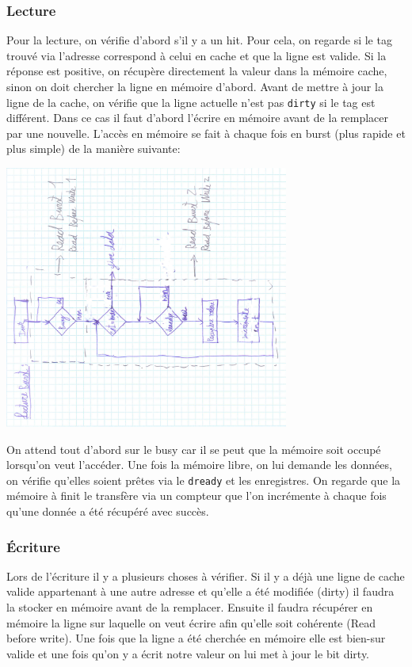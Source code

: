 \documentclass[10pt,a4paper]{article}
\begin{document}
\subsubsection{Lecture}
Pour la lecture, on vérifie d'abord s'il y a un hit. Pour cela, on regarde si le tag trouvé via l'adresse correspond à celui en cache et que la ligne est valide.
Si la réponse est positive, on récupère directement la valeur dans la mémoire cache, sinon on doit chercher la ligne en mémoire d'abord. Avant de mettre à jour la ligne de la cache, on vérifie que la ligne actuelle n'est pas \texttt{dirty} si le tag est différent. Dans ce cas il faut d'abord l'écrire en mémoire avant de la remplacer par une nouvelle.
L'accès en mémoire se fait à chaque fois en burst (plus rapide et plus simple) de la manière suivante:

\begin{center}

\includegraphics[width=0.7\textwidth, angle=-90]{images/mss_read}

\end{center}

On attend tout d'abord sur le busy car il se peut que la mémoire soit occupé lorsqu'on veut l’accéder. Une fois la mémoire libre, on lui demande les données, on vérifie qu'elles soient prêtes via le \texttt{dready} et les enregistres. On regarde que la mémoire à finit le transfère via un compteur que l'on incrémente à chaque fois qu'une donnée a été récupéré avec succès.

\subsubsection{Écriture}
Lors de l'écriture il y a plusieurs choses à vérifier. Si il y a déjà une ligne de cache valide appartenant à une autre adresse et qu'elle a été modifiée (dirty) il faudra la stocker en mémoire avant de la remplacer. Ensuite il faudra récupérer en mémoire la ligne sur laquelle on veut écrire afin qu'elle soit cohérente (Read before write). Une fois que la ligne a été cherchée en mémoire elle est bien-sur valide et une fois qu'on y a écrit notre valeur on lui met à jour le bit dirty.
\end{document}
